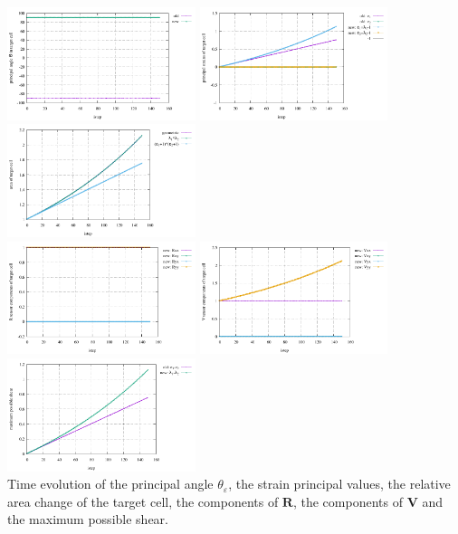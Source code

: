 \begin{center}
\includegraphics[width=5.5cm]{python_codes/fieldstone_89/results/vertical/principal_angle.pdf}
\includegraphics[width=5.5cm]{python_codes/fieldstone_89/results/vertical/principal_strains.pdf}
\includegraphics[width=5.5cm]{python_codes/fieldstone_89/results/vertical/area.pdf}\\
\includegraphics[width=5.5cm]{python_codes/fieldstone_89/results/vertical/R.pdf}
\includegraphics[width=5.5cm]{python_codes/fieldstone_89/results/vertical/V.pdf}
\includegraphics[width=5.5cm]{python_codes/fieldstone_89/results/vertical/maximum_shear.pdf}\\
{\captionfont Time evolution of the principal angle $\theta_\varepsilon$, 
the strain principal values, the relative area change of the target cell, 
the components of ${\bm R}$, the components of ${\bm V}$ and the maximum
possible shear.}
\end{center}






